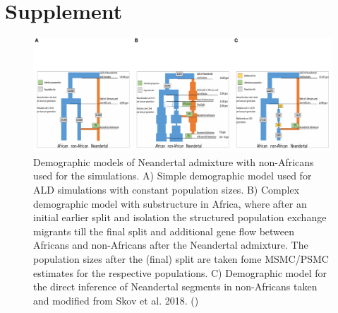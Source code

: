 \documentclass[]{article}
\begin{document}
\hypertarget{refs}{}




\pagebreak
\setcounter{figure}{0} \renewcommand{\figurename}{Fig. S}
\renewcommand{\tablename}{Tab. S}

\section{Supplement}\label{supplement}

\begin{figure}
\centering
\includegraphics{Admixture_Time_Inference_Paper_Draft_files/figure-latex/figS1-1.pdf}
\caption{\label{fig:figS1} Demographic models of Neandertal admixture with non-Africans used for the simulations. A) Simple demographic model used for ALD simulations with constant population sizes. B) Complex demographic model with substructure in Africa, where after an initial earlier split and isolation the structured population exchange migrants till the final split and additional gene flow between Africans and non-Africans after the Neandertal admixture. The  population sizes after the (final) split are taken fome MSMC/PSMC estimates for the respective populations. C) Demographic model for the direct inference of Neandertal segments in non-Africans taken and modified from Skov et al. 2018. (\cite{skov_detecting_2018})}
\end{figure}
\end{document}

